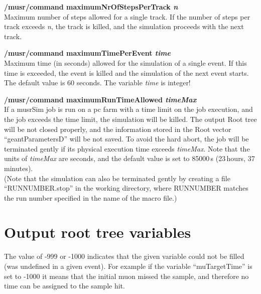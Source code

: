 \documentclass[twoside]{dis04}
\begin{document}
\begin{description}
\item{\bf /musr/command maximumNrOfStepsPerTrack \emph{n}}\\
        Maximum number of steps allowed for a single track.
	If the number of steps per track exceeds \emph{n}, the track is killed,
	and the simulation proceeds with the next track.

\item{\bf /musr/command maximumTimePerEvent \emph{time}}\\
        Maximum time (in seconds) allowed for the simulation of a single event.
	If this time is exceeded, the event is killed and the simulation
        of the next event starts.  The default value is 60 seconds.
	The variable \emph{time} is integer!

\item{\bf /musr/command maximumRunTimeAllowed \emph{timeMax}}\\
	If a musrSim job is run on a pc farm with a time limit on the job execution,
	and the job exceeds the time limit, the simulation will be killed.
	The output Root tree will be not closed properly, and the
	information stored in the Root vector ``geantParametersD''
	will be not saved.  To avoid the hard abort,
	the job will be terminated gently if its physical execution time
	exceeds \emph{timeMax}.  
	Note that the units of \emph{timeMax} are seconds,
	and the default value is set to 85000\,s (23\,hours, 37\,minutes).\\
	(Note that the simulation can also be terminated gently by creating a file
         ``RUNNUMBER.stop'' in the working directory, where RUNNUMBER matches the 
	run number specified in the name of the macro file.)
\end{description}
\section{Output root tree variables}
\label{sec:rootVariables}
The value of -999 or -1000 indicates that the given variable could not be filled
(was undefined in a given event).
For example if the variable ``muTargetTime'' is set to -1000 it means that the initial muon missed the sample, 
and therefore no time can be assigned to the sample hit.
\end{document}
